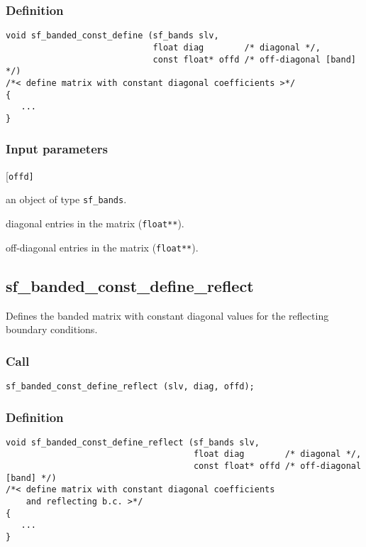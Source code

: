 \subsubsection*{Definition}
\begin{verbatim}
void sf_banded_const_define (sf_bands slv, 
                             float diag        /* diagonal */, 
                             const float* offd /* off-diagonal [band] */)
/*< define matrix with constant diagonal coefficients >*/
{
   ...
}
\end{verbatim}

\subsubsection*{Input parameters}
\begin{desclist}{\tt }{\quad}[\tt offd]
   \setlength\itemsep{0pt}
   \item[slv]  an object of type \texttt{sf\_bands}. 
   \item[diag] diagonal entries in the matrix (\texttt{float**}).  
   \item[offd] off-diagonal entries in the matrix (\texttt{float**}).  
\end{desclist}




\subsection{{sf\_banded\_const\_define\_reflect}}
Defines the banded matrix with constant diagonal values for the reflecting boundary conditions.

\subsubsection*{Call}
\begin{verbatim}sf_banded_const_define_reflect (slv, diag, offd);\end{verbatim}

\subsubsection*{Definition}
\begin{verbatim}
void sf_banded_const_define_reflect (sf_bands slv, 
                                     float diag        /* diagonal */, 
                                     const float* offd /* off-diagonal [band] */)
/*< define matrix with constant diagonal coefficients  
    and reflecting b.c. >*/
{
   ...
}
\end{verbatim}

